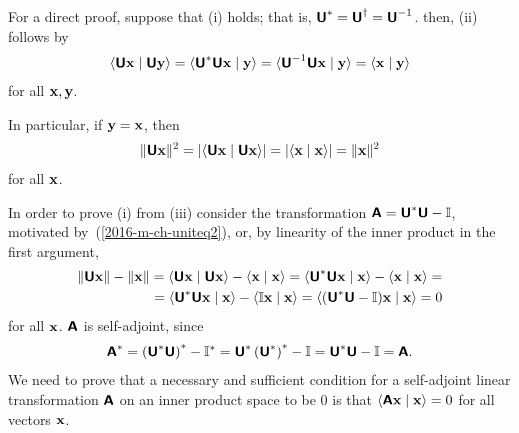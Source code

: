 {\color{OliveGreen}\bproof
For a direct proof,
suppose that (i) holds; that is,
$\textsf{\textbf{U}}^\ast = \textsf{\textbf{U}}^\dagger =\textsf{\textbf{U}}^{-1}$.
then, (ii) follows by
\begin{equation}
\begin{split}
\langle \textsf{\textbf{U}}{\bf x}\mid \textsf{\textbf{U}}{\bf y} \rangle
=
\langle \textsf{\textbf{U}}^\ast\textsf{\textbf{U}}{\bf x}\mid {\bf y} \rangle
=
\langle \textsf{\textbf{U}}^{-1}\textsf{\textbf{U}}{\bf x}\mid {\bf y} \rangle
=
\langle {\bf x}\mid {\bf y} \rangle
\end{split}
\label{2016-m-ch-uniteq}
\end{equation}
for all ${\bf x}, {\bf y}$.

In particular, if ${\bf y} = {\bf x}$, then
\begin{equation}
\begin{split}
\| \textsf{\textbf{U}}{\bf x}\|^2 =
\vert \langle \textsf{\textbf{U}}{\bf x}\mid \textsf{\textbf{U}}{\bf x} \rangle \vert
=
\vert \langle {\bf x}\mid {\bf x} \rangle \vert
=
\|{\bf x}\|^2
\end{split}
\label{2016-m-ch-uniteq2}
\end{equation}
for all ${\bf x}$.

In order to prove (i) from (iii) consider the transformation
$\textsf{\textbf{A}} = \textsf{\textbf{U}}^\ast\textsf{\textbf{U}} - {\Bbb I}$, motivated by~(\ref{2016-m-ch-uniteq2}),
or, by linearity of the inner product in the first argument,
\begin{equation}
\begin{split}
\| \textsf{\textbf{U}}{\bf x}\| - \|{\bf x}\|
= \langle \textsf{\textbf{U}}{\bf x}\mid \textsf{\textbf{U}}{\bf x} \rangle
-
 \langle {\bf x}\mid {\bf x} \rangle  =
\langle \textsf{\textbf{U}}^\ast \textsf{\textbf{U}}{\bf x}\mid {\bf x} \rangle
-
 \langle {\bf x}\mid {\bf x} \rangle=        \\   =
\langle \textsf{\textbf{U}}^\ast \textsf{\textbf{U}}{\bf x}\mid {\bf x} \rangle
-
 \langle {\Bbb I}{\bf x}\mid {\bf x} \rangle  =
 \langle (\textsf{\textbf{U}}^\ast \textsf{\textbf{U}} - {\Bbb I}){\bf x}\mid {\bf x} \rangle
=
0
\end{split}
\end{equation}
for all ${\bf x}$.
$\textsf{\textbf{A}}$ is self-adjoint, since
\begin{equation}
\begin{split}
\textsf{\textbf{A}}^\ast  =\left( \textsf{\textbf{U}}^\ast \textsf{\textbf{U}} \right)^\ast - {\Bbb I}^\ast
=\textsf{\textbf{U}}^\ast \left(\textsf{\textbf{U}}^\ast \right)^\ast - {\Bbb I} =
\textsf{\textbf{U}}^\ast \textsf{\textbf{U}} - {\Bbb I} =\textsf{\textbf{A}}
.
\end{split}
\label{2016-m-ch-uniteq3}
\end{equation}
We need to prove
that a necessary and sufficient condition for a self-adjoint linear
transformation $\textsf{\textbf{A}}$
on an inner product space to be $0$ is that $\langle \textsf{\textbf{A}}{\bf x} \mid {\bf x} \rangle = 0$ for
all vectors ${\bf x}$.

}
